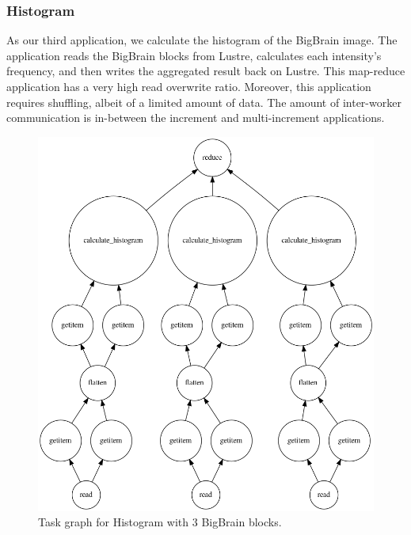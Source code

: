 \documentclass[conference]{IEEEtran}
\begin{document}
% 

	
\subsubsection{Histogram}
As our third application, we calculate the histogram of the BigBrain image. 
The application reads the BigBrain blocks from Lustre, calculates each intensity's frequency, and then writes the aggregated result back on Lustre.
This map-reduce application has a very high read overwrite ratio.
Moreover, this application requires shuffling, albeit of a limited amount of data. 
The amount of inter-worker communication is in-between the increment and multi-increment applications.

\begin{figure}[!hb]
	\centering
	\includegraphics[height=\columnwidth,
	angle=0]{figures/histogram.png}
	\caption{Task graph for Histogram with 3 BigBrain blocks.}
	\label{fig:graph-histogram}
\end{figure}
	
\end{document}
